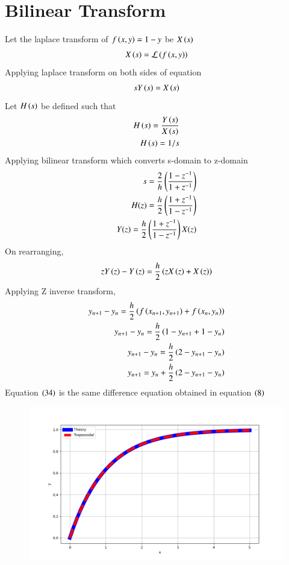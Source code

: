 \documentclass[journal,12pt,onecolumn]{IEEEtran}
\theoremstyle{remark}
\begin{document}
\section{Bilinear Transform}
Let the laplace transform of $f\left(x,y\right)=1-y$ be $X\left(s\right)$
\begin{align}
    X\left(s\right)=\mathcal{L}\left(f\left(x,y\right)\right)
\end{align}
Applying laplace transform on both sides of equation 
\begin{align}
    sY\left(s\right)=X\left(s\right)
\end{align}
Let $H\left(s\right)$ be defined such that
\begin{align}
    H\left(s\right)=\frac{Y\left(s\right)}{X\left(s\right)}\\
    H\left(s\right)=1/s
\end{align}
Applying bilinear transform which converts s-domain to z-domain
\begin{align}
    s = \frac{2}{h} \left(\frac{1 - z^{-1}}{1 + z^{-1}}\right) \\
    H(z) = \frac{h}{2} \left(\frac{1 + z^{-1}}{1 - z^{-1}}\right) \\
    Y(z) = \frac{h}{2} \left(\frac{1 + z^{-1}}{1 - z^{-1}}\right) X(z) \\
\end{align}
On rearranging,
\begin{align}
    zY\left(z\right)-Y\left(z\right)=\frac{h}{2}\left(zX\left(z\right)+X\left(z\right)\right)
\end{align}
Applying Z inverse transform,
\begin{align}
    y_{n+1}-y_{n}=\frac{h}{2}\left(f\left(x_{n+1},y_{n+1}\right)+f\left(x_n,y_n\right)\right)\\
    y_{n+1}-y_{n}=\frac{h}{2}\left(1-y_{n+1}+1-y_n\right)\\
    y_{n+1}-y_{n}=\frac{h}{2}\left(2-y_{n+1}-y_n\right)\\
    y_{n+1}=y_{n}+\frac{h}{2}\left(2-y_{n+1}-y_n\right)
\end{align}
Equation $\left(34\right)$ is the same difference equation obtained in equation $\left(8\right)$


\begin{figure}[h!]
    \centering
    \includegraphics[width=0.7\columnwidth]{figs/Q2.png}
    \label{stemplot}
\end{figure}
\end{document}
